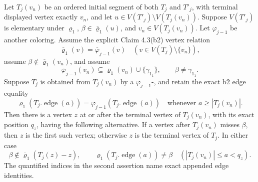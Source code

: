 \begin{lemma}
Let \(T_j(v_n)\) be an ordered initial segment of both \(T_j\) and
\(T'_j\), with terminal displayed vertex exactly \(v_n\), and let
\(u\in V(T'_j)\setminus V(T_j(v_n))\).  Suppose
\(V(T'_j)\) is elementary under \(\varrho_1\),
\(\beta\in\overline{\varrho}_1(u)\), and
\(v_n\in V(T_j(v_n))\).  Let \(\varphi_{j-1}\) be another coloring.
Assume the explicit Claim 4.3(b2) vertex relation
\[
 \overline{\varrho}_1(v)=\overline\varphi_{j-1}(v)
 \quad(v\in V(T_j)\setminus\{v_n\}),                           \tag{b2v}
\]
assume \(\beta\notin\overline{\varrho}_1(v_n)\), and assume
\[
 \overline\varphi_{j-1}(v_n)
   \subseteq\overline{\varrho}_1(v_n)\cup\{\gamma_{1_1}\},
 \qquad \beta\ne\gamma_{1_1}.                                 \tag{3}
\]
Suppose \(T_j\) is obtained from \(T_j(v_n)\) by a
\(\varphi_{j-1}\)-, and retain the
exact b2 edge equality
\[
 \varrho_1(T_j.\operatorname{edge}(a))
 =\varphi_{j-1}(T_j.\operatorname{edge}(a))
 \quad\text{whenever }a\ge |T_j(v_n)|.                        \tag{b2e}
\]
Then there is a vertex \(z\) at or after the terminal vertex of
\(T_j(v_n)\), with its exact position \(q_z\), having the following
alternative.  If a vertex after
\(T_j(v_n)\) misses \(\beta\), then \(z\) is the first such vertex;
otherwise \(z\) is the terminal vertex of \(T_j\).  In either case
\[
 \beta\notin\overline{\varrho}_1(T_j(z)-z),\qquad
 \varrho_1(T_j.\operatorname{edge}(a))\ne\beta
 \quad(|T_j(v_n)|\le a<q_z).                                  \tag{23}
\]
The quantified indices in the second assertion name exact appended edge
identities.
\end{lemma}
